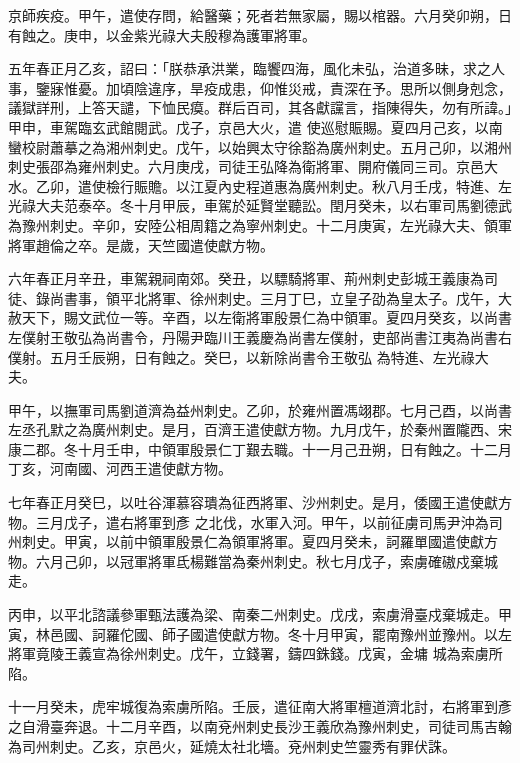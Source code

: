 \begin{pinyinscope}
 京師疾疫。甲午，遣使存問，給醫藥；死者若無家屬，賜以棺器。六月癸卯朔，日有蝕之。庚申，以金紫光祿大夫殷穆為護軍將軍。



 五年春正月乙亥，詔曰：「朕恭承洪業，臨饗四海，風化未弘，治道多昧，求之人事，鑒寐惟憂。加頃陰違序，旱疫成患，仰惟災戒，責深在予。思所以側身剋念，議獄詳刑，上答天譴，下恤民瘼。群后百司，其各獻讜言，指陳得失，勿有所諱。」甲申，車駕臨玄武館閱武。戊子，京邑大火，遣
 使巡慰賑賜。夏四月己亥，以南蠻校尉蕭摹之為湘州刺史。戊午，以始興太守徐豁為廣州刺史。五月己卯，以湘州刺史張邵為雍州刺史。六月庚戌，司徒王弘降為衛將軍、開府儀同三司。京邑大水。乙卯，遣使檢行賑贍。以江夏內史程道惠為廣州刺史。秋八月壬戌，特進、左光祿大夫范泰卒。冬十月甲辰，車駕於延賢堂聽訟。閏月癸未，以右軍司馬劉德武為豫州刺史。辛卯，安陸公相周籍之為寧州刺史。十二月庚寅，左光祿大夫、領軍
 將軍趙倫之卒。是歲，天竺國遣使獻方物。



 六年春正月辛丑，車駕親祠南郊。癸丑，以驃騎將軍、荊州刺史彭城王義康為司徒、錄尚書事，領平北將軍、徐州刺史。三月丁巳，立皇子劭為皇太子。戊午，大赦天下，賜文武位一等。辛酉，以左衛將軍殷景仁為中領軍。夏四月癸亥，以尚書左僕射王敬弘為尚書令，丹陽尹臨川王義慶為尚書左僕射，吏部尚書江夷為尚書右僕射。五月壬辰朔，日有蝕之。癸巳，以新除尚書令王敬弘
 為特進、左光祿大夫。



 甲午，以撫軍司馬劉道濟為益州刺史。乙卯，於雍州置馮翊郡。七月己酉，以尚書左丞孔默之為廣州刺史。是月，百濟王遣使獻方物。九月戊午，於秦州置隴西、宋康二郡。冬十月壬申，中領軍殷景仁丁艱去職。十一月己丑朔，日有蝕之。十二月丁亥，河南國、河西王遣使獻方物。



 七年春正月癸巳，以吐谷渾慕容璝為征西將軍、沙州刺史。是月，倭國王遣使獻方物。三月戊子，遣右將軍到彥
 之北伐，水軍入河。甲午，以前征虜司馬尹沖為司州刺史。甲寅，以前中領軍殷景仁為領軍將軍。夏四月癸未，訶羅單國遣使獻方物。六月己卯，以冠軍將軍氐楊難當為秦州刺史。秋七月戊子，索虜確磝戍棄城走。



 丙申，以平北諮議參軍甄法護為梁、南秦二州刺史。戊戌，索虜滑臺戍棄城走。甲寅，林邑國、訶羅佗國、師子國遣使獻方物。冬十月甲寅，罷南豫州並豫州。以左將軍竟陵王義宣為徐州刺史。戊午，立錢署，鑄四銖錢。戊寅，金墉
 城為索虜所陷。



 十一月癸未，虎牢城復為索虜所陷。壬辰，遣征南大將軍檀道濟北討，右將軍到彥之自滑臺奔退。十二月辛酉，以南兗州刺史長沙王義欣為豫州刺史，司徒司馬吉翰為司州刺史。乙亥，京邑火，延燒太社北墻。兗州刺史竺靈秀有罪伏誅。




\end{pinyinscope}
